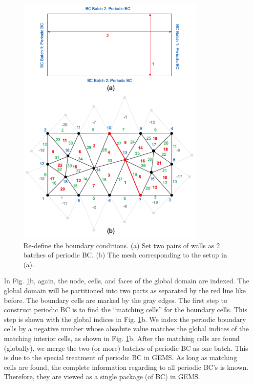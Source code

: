 \documentclass[12pt, letterpaper]{report}
\begin{document}
\begin{figure}[H]
   \centering
   \includegraphics[height=5in]{Mesh5.png}
   \caption{Re-define the boundary conditions. (a) Set two pairs of walls as 2 batches of periodic
   BC. (b) The mesh corresponding to the setup in (a).}
   \label{fig-mesh5}
\end{figure}
\paraspace

In Fig. \ref{fig-mesh5}b, again, the node, cells, and faces of the global domain are indexed. The
global domain will be partitioned into two parts as separated by the red line like before. The
boundary cells are marked by the gray edges. The first step to construct periodic BC is to find the
``matching cells'' for the boundary cells. This step is shown with the global indices in Fig.
\ref{fig-mesh5}b. We index the periodic boundary cells by a negative number whose absolute value
matches the global indices of the matching interior cells, as shown in Fig. \ref{fig-mesh5}b. After
the matching cells are found (globally), we merge the two (or more) batches of periodic BC as one
batch. This is due to the special treatment of periodic BC in GEMS. As long as matching cells are
found, the complete information regarding to all periodic BC's is known. Therefore, they are viewed
as a single package (of BC) in GEMS.  \paraspace
\end{document}
